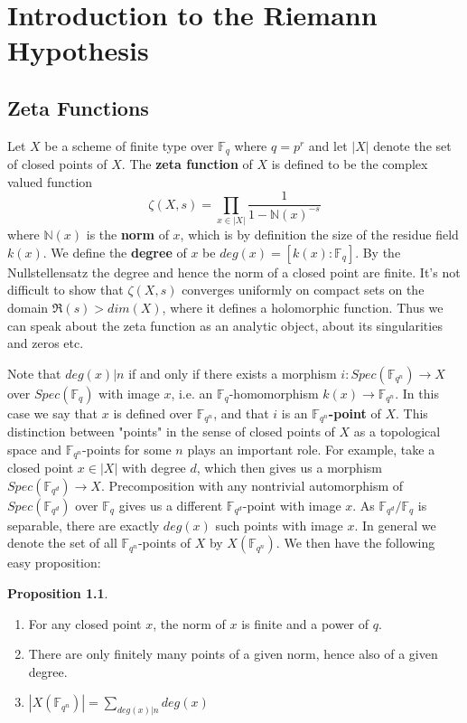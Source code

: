 \documentclass{ucbthesis}
\theoremstyle{definition}
\theoremstyle{theorem}
\newtheorem{prop}[thm]{Proposition}
\begin{document}
\chapter{Introduction to the Riemann Hypothesis}

\section{Zeta Functions}
Let $X$ be a scheme of finite type over $\mathbb{F}_{q}$ where $q=p^{r}$ and let $|X|$ denote the set of closed points of $X$. The \textbf{zeta function} of $X$ is defined to be the complex valued function
$$\zeta(X,s) = \prod\limits_{x\in |X|}{\frac{1}{1-\mathbb{N}(x)^{-s}}}$$
where $\mathbb{N}(x)$ is the \textbf{norm} of $x$, which is by definition the size of the residue field $k(x)$. We define the \textbf{degree} of $x$ be $deg(x) = [k(x):\mathbb{F}_{q}]$. By the Nullstellensatz the degree and hence the norm of a closed point are finite. It's not difficult to show that $\zeta(X,s)$ converges uniformly on compact sets on the domain $\Re(s)>dim(X)$, where it defines a holomorphic function. Thus we can speak about the zeta function as an analytic object, about its singularities and zeros etc. 

Note that $deg(x)|n$ if and only if there exists a morphism $i:Spec(\mathbb{F}_{q^{n}})\rightarrow X$ over $Spec(\mathbb{F}_{q})$ with image $x$, i.e. an $\mathbb{F}_{q}$-homomorphism $k(x)\rightarrow \mathbb{F}_{q^{n}}$. In this case we say that $x$ is defined over $\mathbb{F}_{q^n}$, and that $i$ is an $\mathbb{F}_{q^{n}}$\textbf{-point} of $X$. This distinction between "points" in the sense of closed points of $X$ as a topological space and $\mathbb{F}_{q^{n}}$-points for some $n$ plays an important role. For example, take a closed point $x\in |X|$ with degree $d$, which then gives us a morphism $Spec(\mathbb{F}_{q^d}) \rightarrow X$. Precomposition with any nontrivial automorphism of $Spec(\mathbb{F}_{q^d})$ over $\mathbb{F}_{q}$ gives us a different $\mathbb{F}_{q^d}$-point with image $x$. As $\mathbb{F}_{q^{d}}/\mathbb{F}_{q}$ is separable, there are exactly $deg(x)$ such points with image $x$. In general we denote the set of all $\mathbb{F}_{q^{n}}$-points of $X$ by $X(\mathbb{F}_{q^n})$. We then have the following easy proposition:

\begin{prop}
\begin{enumerate}
  \item For any closed point $x$, the norm of $x$ is finite and a power of $q$.
  \item There are only finitely many points of a given norm, hence also of a given degree.  
  \item $|X(\mathbb{F}_{q^n})| = \sum\limits_{deg(x)|n}deg(x)$
\end{enumerate}
\end{prop}
\end{document}
